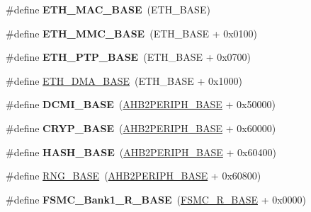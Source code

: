 \begin{DoxyCompactItemize}
\item 
\#define {\bfseries E\+T\+H\+\_\+\+M\+A\+C\+\_\+\+B\+A\+SE}~(E\+T\+H\+\_\+\+B\+A\+SE)\hypertarget{group___peripheral__memory__map_ga3cf7005808feb61bff1fee01e50a711a}{}\label{group___peripheral__memory__map_ga3cf7005808feb61bff1fee01e50a711a}

\item 
\#define {\bfseries E\+T\+H\+\_\+\+M\+M\+C\+\_\+\+B\+A\+SE}~(E\+T\+H\+\_\+\+B\+A\+SE + 0x0100)\hypertarget{group___peripheral__memory__map_ga4946f2b3b03f7998343ac1778fbcf725}{}\label{group___peripheral__memory__map_ga4946f2b3b03f7998343ac1778fbcf725}

\item 
\#define {\bfseries E\+T\+H\+\_\+\+P\+T\+P\+\_\+\+B\+A\+SE}~(E\+T\+H\+\_\+\+B\+A\+SE + 0x0700)\hypertarget{group___peripheral__memory__map_gaa0f60b922aeb7275c785cbaa8f94ecf0}{}\label{group___peripheral__memory__map_gaa0f60b922aeb7275c785cbaa8f94ecf0}

\item 
\#define \hyperlink{group___peripheral__memory__map_gace2114e1b37c1ba88d60f3e831b67e93}{E\+T\+H\+\_\+\+D\+M\+A\+\_\+\+B\+A\+SE}~(E\+T\+H\+\_\+\+B\+A\+SE + 0x1000)
\item 
\#define {\bfseries D\+C\+M\+I\+\_\+\+B\+A\+SE}~(\hyperlink{group___peripheral__memory__map_gaeedaa71d22a1948492365e2cd26cfd46}{A\+H\+B2\+P\+E\+R\+I\+P\+H\+\_\+\+B\+A\+SE} + 0x50000)\hypertarget{group___peripheral__memory__map_ga55b794507e021135486de57129a2505c}{}\label{group___peripheral__memory__map_ga55b794507e021135486de57129a2505c}

\item 
\#define {\bfseries C\+R\+Y\+P\+\_\+\+B\+A\+SE}~(\hyperlink{group___peripheral__memory__map_gaeedaa71d22a1948492365e2cd26cfd46}{A\+H\+B2\+P\+E\+R\+I\+P\+H\+\_\+\+B\+A\+SE} + 0x60000)\hypertarget{group___peripheral__memory__map_ga019f3ad3b3212e56b45984efd8b8efef}{}\label{group___peripheral__memory__map_ga019f3ad3b3212e56b45984efd8b8efef}

\item 
\#define {\bfseries H\+A\+S\+H\+\_\+\+B\+A\+SE}~(\hyperlink{group___peripheral__memory__map_gaeedaa71d22a1948492365e2cd26cfd46}{A\+H\+B2\+P\+E\+R\+I\+P\+H\+\_\+\+B\+A\+SE} + 0x60400)\hypertarget{group___peripheral__memory__map_ga398d121ca28c3f0f90a140b62184e242}{}\label{group___peripheral__memory__map_ga398d121ca28c3f0f90a140b62184e242}

\item 
\#define \hyperlink{group___peripheral__memory__map_gab92662976cfe62457141e5b4f83d541c}{R\+N\+G\+\_\+\+B\+A\+SE}~(\hyperlink{group___peripheral__memory__map_gaeedaa71d22a1948492365e2cd26cfd46}{A\+H\+B2\+P\+E\+R\+I\+P\+H\+\_\+\+B\+A\+SE} + 0x60800)
\item 
\#define {\bfseries F\+S\+M\+C\+\_\+\+Bank1\+\_\+\+R\+\_\+\+B\+A\+SE}~(\hyperlink{group___peripheral__memory__map_gaddf0e199dccba83272b20c9fb4d3aaed}{F\+S\+M\+C\+\_\+\+R\+\_\+\+B\+A\+SE} + 0x0000)\hypertarget{group___peripheral__memory__map_gad196fe6f5e4041b201d14f43508c06d2}{}\label{group___peripheral__memory__map_gad196fe6f5e4041b201d14f43508c06d2}


\end{DoxyCompactItemize}
